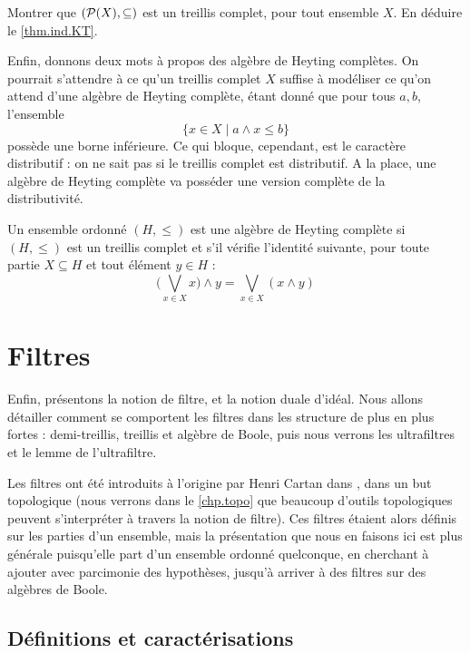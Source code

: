 \begin{exercise}
  Montrer que $(\mathcal{P}(X),\subseteq)$ est un treillis complet, pour tout
  ensemble $X$. En déduire le \cref{thm.ind.KT}.
\end{exercise}

Enfin, donnons deux mots à propos des algèbre de Heyting complètes. On pourrait
s'attendre à ce qu'un treillis complet $X$ suffise à modéliser ce qu'on attend
d'une algèbre de Heyting complète, étant donné que pour tous $a,b$, l'ensemble
\[\{x \in X \mid a \land x \leq b\}\]
possède une borne inférieure. Ce qui bloque, cependant, est le caractère
distributif : on ne sait pas si le treillis complet est distributif. A la place,
une algèbre de Heyting complète va posséder une version complète de la
distributivité.

\begin{definition}
  Un ensemble ordonné $(H,\leq)$ est une algèbre de Heyting complète si
  $(H,\leq)$ est un treillis complet et s'il vérifie l'identité suivante, pour
  toute partie $X\subseteq H$ et tout élément $y \in H$ :
  \[\Bigg(\bigvee_{x\in X}x\Bigg) \land y = \bigvee_{x\in X}(x\land y)\]
\end{definition}

\section{Filtres}

Enfin, présentons la notion de filtre, et la notion duale d'idéal. Nous allons
détailler comment se comportent les filtres dans les structure de plus en plus
fortes : demi-treillis, treillis et algèbre de Boole, puis nous verrons les
ultrafiltres et le lemme de l'ultrafiltre.

Les filtres ont été introduits à l'origine par Henri Cartan dans
\cite{bourbaki1971topologie}, dans un but topologique (nous verrons dans le
\cref{chp.topo} que beaucoup d'outils topologiques peuvent s'interpréter à
travers la notion de filtre). Ces filtres étaient alors définis sur les parties
d'un ensemble, mais la présentation que nous en faisons ici est plus générale
puisqu'elle part d'un ensemble ordonné quelconque, en cherchant à ajouter avec
parcimonie des hypothèses, jusqu'à arriver à des filtres sur des algèbres de
Boole.

\subsection{Définitions et caractérisations}

